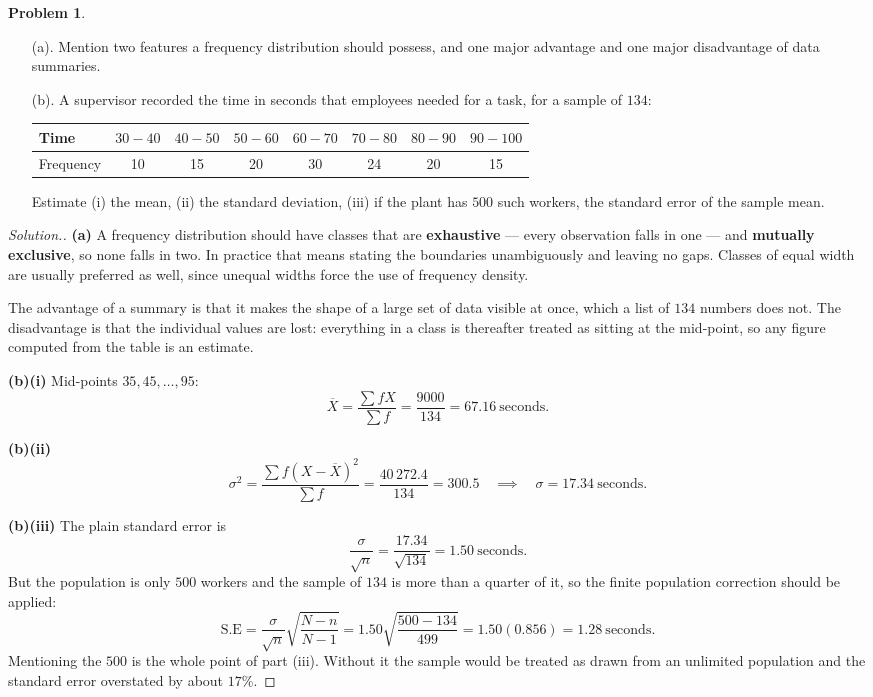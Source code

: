 \documentclass[11pt,a4paper]{article}
\theoremstyle{definition}
\newtheorem{problemx}{Problem}[section]
\newenvironment{problem}{\begin{problemx}}{\end{problemx}}
\newenvironment{solution}
  {\renewcommand{\qedsymbol}{}\begin{proof}[\textit{Solution}.]}
  {\end{proof}}
\begin{document}
\begin{problem}
\begin{enumerate}
\item[(a).] Mention two features a frequency distribution should possess, and one major
advantage and one major disadvantage of data summaries.
\item[(b).] A supervisor recorded the time in seconds that employees needed for a task, for a
sample of $134$:
\begin{table}[H]
\centering
\begin{tabular}{|l|c|c|c|c|c|c|c|}
\hline
Time & $30-40$ & $40-50$ & $50-60$ & $60-70$ & $70-80$ & $80-90$ & $90-100$\\
\hline
Frequency & 10 & 15 & 20 & 30 & 24 & 20 & 15\\
\hline
\end{tabular}
\end{table}
Estimate (i) the mean, (ii) the standard deviation, (iii) if the plant has $500$ such
workers, the standard error of the sample mean.
\end{enumerate}
\end{problem}

\begin{solution}
\textbf{(a)} A frequency distribution should have classes that are \textbf{exhaustive} ---
every observation falls in one --- and \textbf{mutually exclusive}, so none falls in two. In
practice that means stating the boundaries unambiguously and leaving no gaps. Classes of equal
width are usually preferred as well, since unequal widths force the use of frequency density.

The advantage of a summary is that it makes the shape of a large set of data visible at once,
which a list of $134$ numbers does not. The disadvantage is that the individual values are
lost: everything in a class is thereafter treated as sitting at the mid-point, so any figure
computed from the table is an estimate.

\textbf{(b)(i)} Mid-points $35, 45, \ldots, 95$:
\[\overline{X}=\frac{\sum fX}{\sum f}=\frac{9000}{134}=67.16\ \text{seconds}.\]

\textbf{(b)(ii)}
\[\sigma^2=\frac{\sum f(X-\overline{X})^2}{\sum f}=\frac{40\,272.4}{134}=300.5
\quad\implies\quad \sigma=17.34\ \text{seconds}.\]

\textbf{(b)(iii)} The plain standard error is
\[\frac{\sigma}{\sqrt{n}}=\frac{17.34}{\sqrt{134}}=1.50\ \text{seconds}.\]
But the population is only $500$ workers and the sample of $134$ is more than a quarter of it,
so the finite population correction should be applied:
\[\text{S.E}=\frac{\sigma}{\sqrt{n}}\sqrt{\frac{N-n}{N-1}}
=1.50\sqrt{\frac{500-134}{499}}=1.50(0.856)=1.28\ \text{seconds}.\]
Mentioning the $500$ is the whole point of part (iii). Without it the sample would be treated
as drawn from an unlimited population and the standard error overstated by about $17\%$.
\end{solution}
\end{document}
